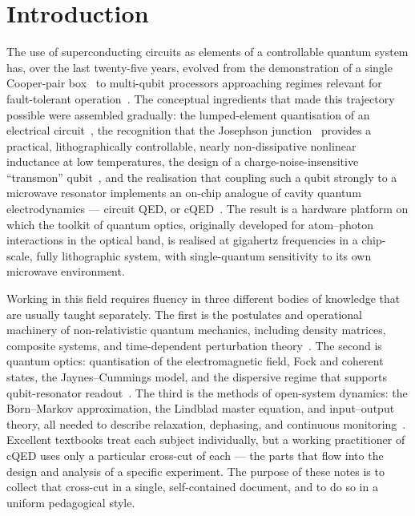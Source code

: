 \chapter*{Introduction}

The use of superconducting circuits as elements of a controllable
quantum system has, over the last twenty-five years, evolved from
the demonstration of a single Cooper-pair box~\cite{nakamura1999}
to multi-qubit processors approaching regimes relevant for fault-tolerant
operation~\cite{arute2019,acharya2023}. The conceptual
ingredients that made this trajectory possible were assembled
gradually: the lumped-element quantisation of an electrical
circuit~\cite{devoret1995,vool2017}, the recognition that the
Josephson junction~\cite{josephson1962} provides a practical,
lithographically controllable, nearly non-dissipative nonlinear
inductance at low temperatures, the
design of a charge-noise-insensitive ``transmon''
qubit~\cite{koch2007}, and the realisation that coupling such a
qubit strongly to a microwave resonator implements an on-chip
analogue of cavity quantum electrodynamics --- circuit QED, or
cQED~\cite{blais2004,wallraff2004,blais2021}. The result is a
hardware platform on which the toolkit of quantum optics,
originally developed for atom--photon interactions in the optical
band, is realised at gigahertz frequencies in a chip-scale, fully
lithographic system, with single-quantum sensitivity to its own
microwave environment.

Working in this field requires fluency in three different bodies
of knowledge that are usually taught separately. The first is the
postulates and operational machinery of non-relativistic quantum
mechanics, including density matrices, composite systems, and
time-dependent perturbation theory~\cite{nielsen2010}. The second
is quantum optics: quantisation of the electromagnetic field,
Fock and coherent states, the Jaynes--Cummings model, and the
dispersive regime that supports
qubit-resonator readout~\cite{walls2008,haroche2006,blais2021}.
The third is the methods of open-system dynamics: the
Born--Markov approximation, the Lindblad master equation, and
input--output theory, all needed to describe relaxation,
dephasing, and continuous monitoring~\cite{lindblad1976,gardiner2004,breuer2002}.
Excellent textbooks treat each subject individually, but a working
practitioner of cQED uses only a particular cross-cut of each ---
the parts that flow into the design and analysis of a specific
experiment. The purpose of these notes is to collect that
cross-cut in a single, self-contained document, and to do so in a
uniform pedagogical style.

